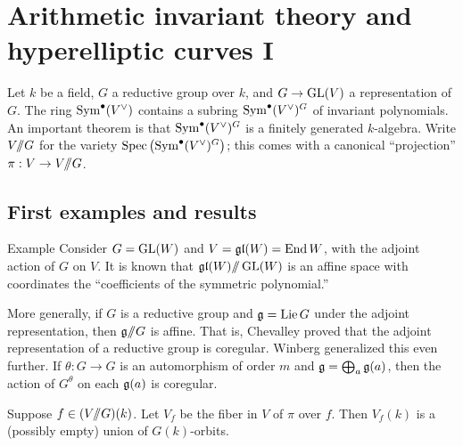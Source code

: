 
\section{Arithmetic invariant theory and hyperelliptic curves I}





Let $k$ be a field, $G$ a reductive group over $k$, and 
$G\to \operatorname{GL}(V)$ a representation of $G$. The ring 
$\operatorname{Sym}^\bullet(V^\vee)$ contains a subring 
$\operatorname{Sym}^\bullet(V^\vee)^G$ of invariant polynomials. An important theorem 
is that $\operatorname{Sym}^\bullet(V^\vee)^G$ is a finitely generated $k$-algebra. 
Write $V/\!\!/ G$ for the variety 
$\operatorname{Spec}\left(\operatorname{Sym}^\bullet(V^\vee)^G\right)$; this comes with a 
canonical ``projection'' $\pi:V\to V/\!\!/ G$. 





\subsection{First examples and results}

\begin{enonce}[remark]{Example}
Consider $G=\operatorname{GL}(W)$ and $V=\mathfrak{gl}(W)=\operatorname{End} W$, with the 
adjoint action of $G$ on $V$. It is known that 
$\mathfrak{gl}(W)/\!\!/ \operatorname{GL}(W)$ is an affine space with coordinates the 
``coefficients of the symmetric polynomial.'' 
\end{enonce}

More generally, if $G$ is a reductive group and $\mathfrak{g}=\operatorname{Lie} G$ under the 
adjoint representation, then $\mathfrak{g}/\!\!/ G$ is affine. That is, Chevalley 
proved that the adjoint representation of a reductive group is coregular. 
Winberg generalized this even further. If $\theta:G\to G$ is an 
automorphism of order $m$ and $\mathfrak{g}=\bigoplus_a \mathfrak{g}(a)$, then 
the action of $G^\theta$ on each $\mathfrak{g}(a)$ is coregular. 

Suppose $f\in (V/\!\!/ G)(k)$. Let $V_f$ be the fiber in $V$ of $\pi$ over $f$. 
Then $V_f(k)$ is a (possibly empty) union of $G(k)$-orbits. 

